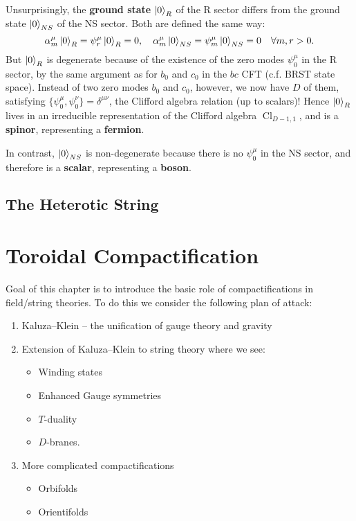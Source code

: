 \documentclass{report}
\theoremstyle{plain}
\theoremstyle{definition}
\theoremstyle{remark}
\DeclareMathOperator{\Cl}{Cl}
\begin{document}
Unsurprisingly, the {\bf ground state} $\ket{0}_R$ of the R sector
differs from the ground state $\ket{0}_{NS}$ of the NS sector. Both
are defined the same way:
\[ \alpha^\mu_m \ket{0}_R = \psi^\mu_r \ket{0}_R = 0, \quad \alpha^\mu_m \ket{0}_{NS} = \psi^\mu_m \ket{0}_{NS} = 0 \quad \forall m, r > 0. \]
But $\ket{0}_R$ is degenerate because of the existence of the zero
modes $\psi^\mu_0$ in the R sector, by the same argument as for $b_0$
and $c_0$ in the $bc$ CFT (c.f. BRST state space). Instead of two zero
modes $b_0$ and $c_0$, however, we now have $D$ of them, satisfying
$\{\psi^\mu_0, \psi^\nu_0\} = \delta^{\mu\nu}$, the Clifford algebra
relation (up to scalars)! Hence $\ket{0}_R$ lives in an irreducible
representation of the Clifford algebra $\Cl_{D-1,1}$, and is a {\bf
  spinor}, representing a {\bf fermion}.

In contrast, $\ket{0}_{NS}$ is non-degenerate because there is no
$\psi^\mu_0$ in the NS sector, and therefore is a {\bf scalar},
representing a {\bf boson}.

\section{The Heterotic String}

\chapter{Toroidal Compactification}

Goal of this chapter is to introduce the basic role of compactifications in
field/string theories. To do this we consider the following plan of attack:
\begin{enumerate}
    \item Kaluza--Klein -- the unification of gauge theory and gravity
    \item Extension of Kaluza--Klein to string theory where we see:
        \begin{itemize}
            \item Winding states
            \item Enhanced Gauge symmetries
            \item $T$-duality
            \item $D$-branes.
        \end{itemize}
    \item More complicated compactifications
        \begin{itemize}
            \item Orbifolds
            \item Orientifolds
        \end{itemize}
\end{enumerate}
\end{document}
